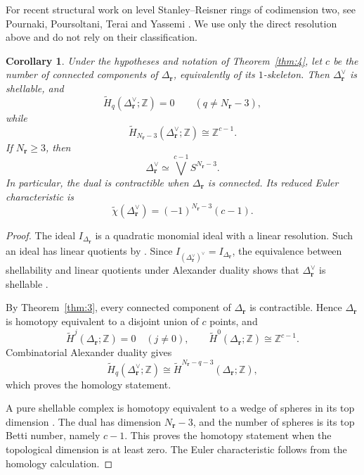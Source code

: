 \documentclass[11pt]{amsart}
\newtheorem{corollary}[theorem]{Corollary}
\theoremstyle{definition}
\theoremstyle{remark}
\begin{document}
	For recent structural work on level Stanley--Reisner rings of codimension two, see Pournaki, Poursoltani, Terai and Yassemi \cite{PPTZ26}. We use only the direct resolution above and do not rely on their classification.
	
	\begin{corollary}\label{cor:11}
		Under the hypotheses and notation of Theorem~\ref{thm:4}, let $c$ be the number of connected components of $\Delta_{\mathbf r}$, equivalently of its $1$-skeleton. Then $\Delta_{\mathbf r}^\vee$ is shellable, and
		\[
		\widetilde H_q(\Delta_{\mathbf r}^\vee;\mathbb Z)=0
		\qquad(q\ne N_{\mathbf r}-3),
		\]
		while
		\[
		\widetilde H_{N_{\mathbf r}-3}(\Delta_{\mathbf r}^\vee;\mathbb Z)
		\cong\mathbb Z^{c-1}.
		\]
		If $N_{\mathbf r}\ge3$, then
		\[
		\Delta_{\mathbf r}^\vee\simeq\bigvee^{c-1}S^{N_{\mathbf r}-3}.
		\]
		In particular, the dual is contractible when $\Delta_{\mathbf r}$ is connected. Its reduced Euler characteristic is
		\[
		\widetilde\chi(\Delta_{\mathbf r}^\vee)=(-1)^{N_{\mathbf r}-3}(c-1).
		\]
	\end{corollary}
	
	\begin{proof}
		The ideal $I_{\Delta_{\mathbf r}}$ is a quadratic monomial ideal with a linear resolution. Such an ideal has linear quotients by \cite{HHZPowers}. Since $I_{(\Delta_{\mathbf r}^\vee)^\vee}=I_{\Delta_{\mathbf r}}$, the equivalence between shellability and linear quotients under Alexander duality shows that $\Delta_{\mathbf r}^\vee$ is shellable \cite[Theorem~1.4(c)]{HHZ04}.
		
		By Theorem~\ref{thm:3}, every connected component of $\Delta_{\mathbf r}$ is contractible. Hence $\Delta_{\mathbf r}$ is homotopy equivalent to a disjoint union of $c$ points, and
		\[
		\widetilde H^j(\Delta_{\mathbf r};\mathbb Z)=0\quad(j\ne0),
		\qquad
		\widetilde H^0(\Delta_{\mathbf r};\mathbb Z)\cong\mathbb Z^{c-1}.
		\]
		Combinatorial Alexander duality \cite{BjornerTancer09} gives
		\[
		\widetilde H_q(\Delta_{\mathbf r}^\vee;\mathbb Z)
		\cong
		\widetilde H^{N_{\mathbf r}-q-3}(\Delta_{\mathbf r};\mathbb Z),
		\]
		which proves the homology statement.
		
		A pure shellable complex is homotopy equivalent to a wedge of spheres in its top dimension \cite[Section~11]{Bjorner95}. The dual has dimension $N_{\mathbf r}-3$, and the number of spheres is its top Betti number, namely $c-1$. This proves the homotopy statement when the topological dimension is at least zero. The Euler characteristic follows from the homology calculation.
	\end{proof}
	
\end{document}
